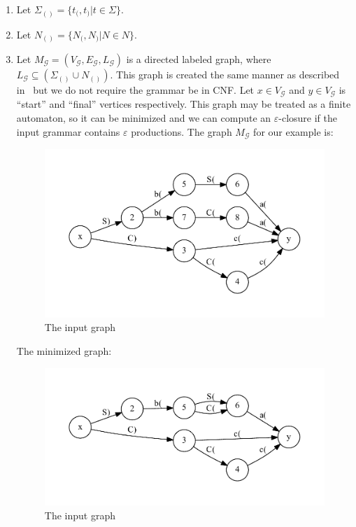 \begin{enumerate}
\item Let $\Sigma_{()} =\{ t_( , t_)  | t \in \Sigma \}$.
\item Let $N_{()} = \{ N_( , N_) | N \in N  \}$.
\item Let $M_{\mathcal{G}} = (V_{\mathcal{G}}, E_{\mathcal{G}}, L_{\mathcal{G}})$ is a directed 
labeled graph, where $L_{\mathcal{G}} \subseteq (\Sigma_{()} \cup N_{()})$.
This graph is created the same manner as described in~\cite{OptimalDLR} but we do not require the grammar be in CNF.
Let $x \in V_{\mathcal{G}}$ and $y \in V_{\mathcal{G}}$ is ``start'' and ``final'' vertices respectively. 
This graph may be treated as a finite automaton, so it can be minimized and we can compute an $\varepsilon$-closure if the input grammar contains $\varepsilon$ productions.
The graph $M_{\mathcal{G}}$ for our example is:

\begin{figure}
\includegraphics[width=.5\textwidth]{dot/grammar_1.pdf}

\label{input}
\caption{The input graph}

\end{figure}


The minimized graph:
\begin{figure}
\includegraphics[width=.5\textwidth]{dot/grammar_min.pdf}

\label{input}
\caption{The input graph}

\end{figure}



\end{enumerate}
